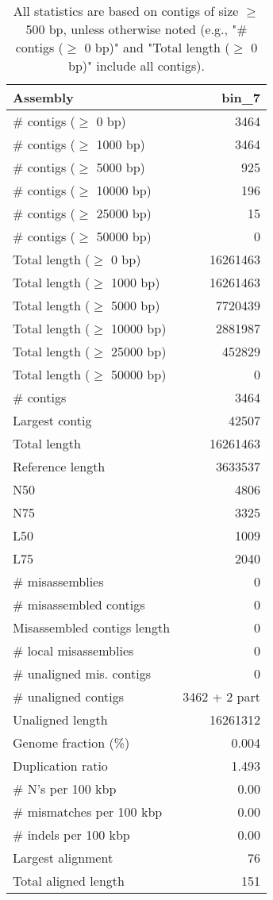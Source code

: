 \documentclass[12pt,a4paper]{article}
\begin{document}
\begin{table}[ht]
\begin{center}
\caption{All statistics are based on contigs of size $\geq$ 500 bp, unless otherwise noted (e.g., "\# contigs ($\geq$ 0 bp)" and "Total length ($\geq$ 0 bp)" include all contigs).}
\begin{tabular}{|l*{1}{|r}|}
\hline
Assembly & bin\_7 \\ \hline
\# contigs ($\geq$ 0 bp) & 3464 \\ \hline
\# contigs ($\geq$ 1000 bp) & 3464 \\ \hline
\# contigs ($\geq$ 5000 bp) & 925 \\ \hline
\# contigs ($\geq$ 10000 bp) & 196 \\ \hline
\# contigs ($\geq$ 25000 bp) & 15 \\ \hline
\# contigs ($\geq$ 50000 bp) & 0 \\ \hline
Total length ($\geq$ 0 bp) & 16261463 \\ \hline
Total length ($\geq$ 1000 bp) & 16261463 \\ \hline
Total length ($\geq$ 5000 bp) & 7720439 \\ \hline
Total length ($\geq$ 10000 bp) & 2881987 \\ \hline
Total length ($\geq$ 25000 bp) & 452829 \\ \hline
Total length ($\geq$ 50000 bp) & 0 \\ \hline
\# contigs & 3464 \\ \hline
Largest contig & 42507 \\ \hline
Total length & 16261463 \\ \hline
Reference length & 3633537 \\ \hline
N50 & 4806 \\ \hline
N75 & 3325 \\ \hline
L50 & 1009 \\ \hline
L75 & 2040 \\ \hline
\# misassemblies & 0 \\ \hline
\# misassembled contigs & 0 \\ \hline
Misassembled contigs length & 0 \\ \hline
\# local misassemblies & 0 \\ \hline
\# unaligned mis. contigs & 0 \\ \hline
\# unaligned contigs & 3462 + 2 part \\ \hline
Unaligned length & 16261312 \\ \hline
Genome fraction (\%) & 0.004 \\ \hline
Duplication ratio & 1.493 \\ \hline
\# N's per 100 kbp & 0.00 \\ \hline
\# mismatches per 100 kbp & 0.00 \\ \hline
\# indels per 100 kbp & 0.00 \\ \hline
Largest alignment & 76 \\ \hline
Total aligned length & 151 \\ \hline
\end{tabular}
\end{center}
\end{table}
\end{document}
